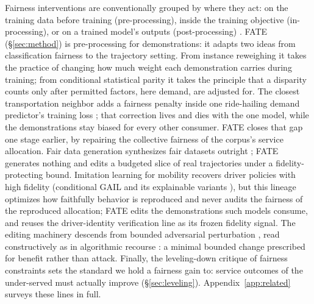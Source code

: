 Fairness interventions are conventionally grouped by where they act: on the
training data before training (pre-processing), inside the training
objective (in-processing), or on a trained model's outputs
(post-processing) \cite{barocas2023}. FATE (\S\ref{sec:method}) is
pre-processing for demonstrations: it adapts two ideas from classification
fairness to the trajectory setting. From instance reweighing \cite{kamirancalders2012} it
takes the practice of changing how much weight each demonstration carries
during training; from conditional statistical parity \cite{corbettdavies2017} it
takes the principle that a disparity counts only after permitted factors,
here demand, are adjusted for. The closest transportation
neighbor adds a fairness penalty inside one ride-hailing demand predictor's
training loss \cite{zheng2023}; that correction lives and dies with the one
model, while the demonstrations stay biased for every other consumer. FATE
closes that gap one stage earlier, by repairing the collective
fairness of the corpus's service allocation. Fair
data generation synthesizes fair datasets outright
\cite{xu2018fairgan,vanbreugel2021decaf}; FATE generates nothing and edits a
budgeted slice of real trajectories under a fidelity-protecting bound. Imitation
learning for mobility recovers driver policies with high fidelity (conditional
GAIL and its explainable variants \cite{zhang2019cgail,zhang2022cgail,pan2020xgail}),
but this lineage optimizes how faithfully behavior is reproduced and never
audits the fairness of the reproduced allocation; FATE edits the
demonstrations such models consume, and reuses the driver-identity
verification line \cite{ren2020stsiamese} as its frozen fidelity signal. The
editing machinery descends from bounded adversarial perturbation
\cite{goodfellow2015fgsm,kurakin2017ifgsm,hu2023stifgsm}, read
constructively as in algorithmic recourse
\cite{ustun2019recourse,wachter2018counterfactual}: a minimal bounded change
prescribed for benefit rather than attack. Finally, the leveling-down
critique of fairness constraints \cite{parfit1997,mittelstadt2024,zietlow2022}
sets the standard we hold a fairness gain to: service outcomes of the under-served must actually
improve (\S\ref{sec:leveling}). Appendix~\ref{app:related} surveys these
lines in full.
